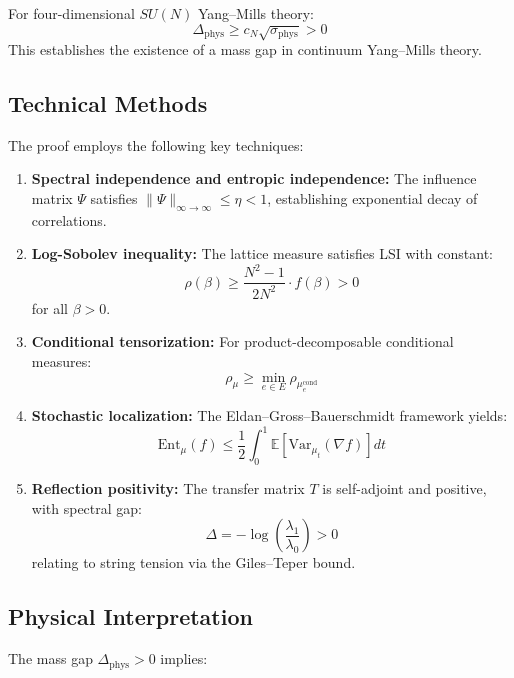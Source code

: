 \begin{theorem}
For four-dimensional $SU(N)$ Yang--Mills theory:
\[
\boxed{\Delta_{\mathrm{phys}} \geq c_N \sqrt{\sigma_{\mathrm{phys}}} > 0}
\]
This establishes the existence of a mass gap in continuum Yang--Mills theory.
\end{theorem}

\subsection{Technical Methods}

The proof employs the following key techniques:

\begin{enumerate}
\item \textbf{Spectral independence and entropic independence:} 
The influence matrix $\Psi$ satisfies $\|\Psi\|_{\infty \to \infty} \leq \eta < 1$, 
establishing exponential decay of correlations.

\item \textbf{Log-Sobolev inequality:}
The lattice measure satisfies LSI with constant:
\[
\rho(\beta) \geq \frac{N^2-1}{2N^2} \cdot f(\beta) > 0
\]
for all $\beta > 0$.

\item \textbf{Conditional tensorization:}
For product-decomposable conditional measures:
\[
\rho_{\mu} \geq \min_{e \in E} \rho_{\mu_e^{\mathrm{cond}}}
\]

\item \textbf{Stochastic localization:}
The Eldan--Gross--Bauerschmidt framework yields:
\[
\mathrm{Ent}_\mu(f) \leq \frac{1}{2} \int_0^1 \mathbb{E}\left[\mathrm{Var}_{\mu_t}(\nabla f)\right] dt
\]

\item \textbf{Reflection positivity:}
The transfer matrix $T$ is self-adjoint and positive, with spectral gap:
\[
\Delta = -\log\left(\frac{\lambda_1}{\lambda_0}\right) > 0
\]
relating to string tension via the Giles--Teper bound.
\end{enumerate}

\subsection{Physical Interpretation}

The mass gap $\Delta_{\mathrm{phys}} > 0$ implies:

